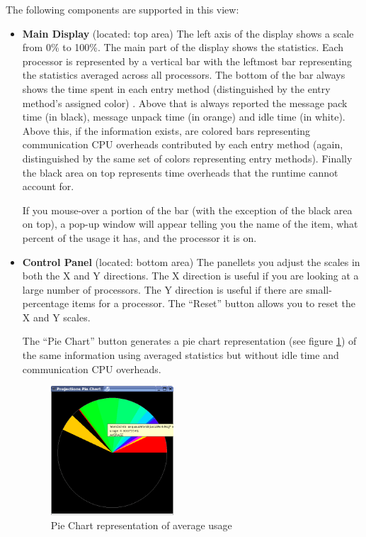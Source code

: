 \documentclass[10pt]{article}
\begin{document}
The following components are supported in this view:

\begin{itemize}
\item[1)] 
{\bf Main Display} (located: top area) 
The left axis of the display shows a scale from 0\% to 100\%.  The
main part of the display shows the statistics.  Each processor is
represented by a vertical bar with the leftmost bar representing the
statistics averaged across all processors. The bottom of the bar
always shows the time spent in each entry method (distinguished by the
entry method's assigned color) . Above that is always reported the
message pack time (in black), message unpack time (in orange) and idle
time (in white). Above this, if the information exists, are colored
bars representing communication CPU overheads contributed by each
entry method (again, distinguished by the same set of colors
representing entry methods). Finally the black area on top represents
time overheads that the \charmpp{} runtime cannot account for.

If you mouse-over a portion of the bar (with the exception of the
black area on top), a pop-up window will appear telling you the name
of the item, what percent of the usage it has, and the processor it is
on.

\item[2)]
{\bf Control Panel} (located: bottom area)
The panellets you adjust the scales in both the X and Y directions.
The X direction is useful if you are looking at a large number of
processors. The Y direction is useful if there are small-percentage
items for a processor. The ``Reset'' button allows you to reset the 
X and Y scales.

The ``Pie Chart'' button generates a pie chart representation (see
figure \ref{piechart}) of the same information using averaged
statistics but without idle time and communication CPU overheads.

\begin{figure}[htb]
\center
\includegraphics[width=1.8in]{fig/piechart}
\caption{Pie Chart representation of average usage}
\label{piechart}
\end{figure}


\end{itemize}
\end{document}
